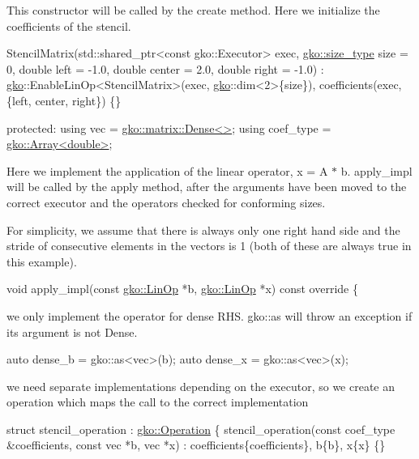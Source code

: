 This constructor will be called by the create method. Here we initialize the coefficients of the stencil.


\begin{DoxyCode}
    StencilMatrix(std::shared\_ptr<const gko::Executor> exec,
                  \hyperlink{namespacegko_a6e5c95df0ae4e47aab2f604a22d98ee7}{gko::size\_type} size = 0, \textcolor{keywordtype}{double} left = -1.0,
                  \textcolor{keywordtype}{double} center = 2.0, \textcolor{keywordtype}{double} right = -1.0)
        : \hyperlink{namespacegko}{gko}::EnableLinOp<StencilMatrix>(exec, \hyperlink{namespacegko}{gko}::dim<2>\{size\}),
          coefficients(exec, \{left, center, right\})
    \{\}

\textcolor{keyword}{protected}:
    \textcolor{keyword}{using} vec = \hyperlink{classgko_1_1matrix_1_1Dense}{gko::matrix::Dense<>};
    \textcolor{keyword}{using} coef\_type = \hyperlink{classgko_1_1Array}{gko::Array<double>};
\end{DoxyCode}


Here we implement the application of the linear operator, x = A $\ast$ b. apply\+\_\+impl will be called by the apply method, after the arguments have been moved to the correct executor and the operators checked for conforming sizes.

For simplicity, we assume that there is always only one right hand side and the stride of consecutive elements in the vectors is 1 (both of these are always true in this example).


\begin{DoxyCode}
\textcolor{keywordtype}{void} apply\_impl(\textcolor{keyword}{const} \hyperlink{classgko_1_1LinOp}{gko::LinOp} *b, \hyperlink{classgko_1_1LinOp}{gko::LinOp} *x)\textcolor{keyword}{ const override}
\textcolor{keyword}{}\{
\end{DoxyCode}


we only implement the operator for dense R\+HS. gko\+::as will throw an exception if its argument is not Dense.


\begin{DoxyCode}
\textcolor{keyword}{auto} dense\_b = gko::as<vec>(b);
\textcolor{keyword}{auto} dense\_x = gko::as<vec>(x);
\end{DoxyCode}


we need separate implementations depending on the executor, so we create an operation which maps the call to the correct implementation


\begin{DoxyCode}
\textcolor{keyword}{struct }stencil\_operation : \hyperlink{classgko_1_1Operation}{gko::Operation} \{
    stencil\_operation(\textcolor{keyword}{const} coef\_type &coefficients, \textcolor{keyword}{const} vec *b,
                      vec *x)
        : coefficients\{coefficients\}, b\{b\}, x\{x\}
    \{\}
\end{DoxyCode}


